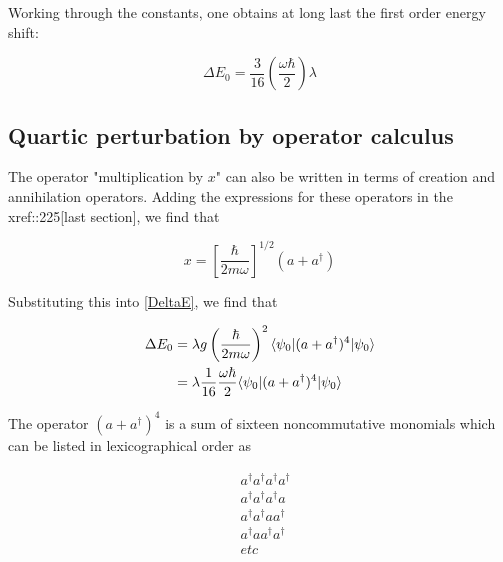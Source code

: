 Working through the constants, one obtains at long last the
first order energy shift:

\begin{equation}
\label{anharmonic_correction}
\Delta E_0 = \frac{3}{16}\left( \frac{\omega \hbar}{2}\right)  \lambda
\end{equation}


\subsection{Quartic perturbation by operator calculus}

The operator "multiplication by $x$" can also be written in terms of creation and annihilation operators.  Adding the expressions for these operators in the xref::225[last section], we find that 

\begin{equation}
x = \left[\frac{ \hbar }{  2m \omega} \right]^{1/2} (a + a^\dagger )
\end{equation}

Substituting this into \eqref{DeltaE}, we find that

\begin{align}
\label{aa4}
\Delta E_0 &= \lambda g \left(\frac{ \hbar }{  2m \omega} \right)^{2} \langle \psi_0 | ( a + a^\dagger )^4 | \psi_0 \rangle \\
&= \lambda \frac{1}{16}\frac{\omega \hbar}{2}\langle \psi_0 | ( a + a^\dagger )^4 | \psi_0 \rangle
\end{align}

The operator $(a + a^\dagger)^4$ is a sum of sixteen noncommutative monomials which can be listed in lexicographical order as 

\begin{align}
& a^\dagger a^\dagger a^\dagger a^\dagger \\
& a^\dagger a^\dagger a^\dagger a \\
& a^\dagger a^\dagger a  a^\dagger \\
& a^\dagger  a  a^\dagger a^\dagger \\
& etc
\end{align}

